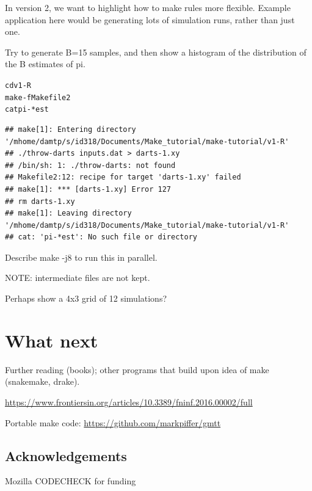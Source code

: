 \documentclass[12pt]{article}\usepackage[]{graphicx}\usepackage[]{color}
\makeatletter
\newenvironment{kframe}{%
 \def\at@end@of@kframe{}%
 \ifinner\ifhmode%
  \def\at@end@of@kframe{\end{minipage}}%
  \begin{minipage}{\columnwidth}%
 \fi\fi%
 \def\FrameCommand##1{\hskip\@totalleftmargin \hskip-\fboxsep
 \colorbox{shadecolor}{##1}\hskip-\fboxsep
     \hskip-\linewidth \hskip-\@totalleftmargin \hskip\columnwidth}%
 \MakeFramed {\advance\hsize-\width
   \@totalleftmargin\z@ \linewidth\hsize
   \@setminipage}}%
 {\par\unskip\endMakeFramed%
 \at@end@of@kframe}
\newenvironment{knitrout}{}{} %
\makeatother
\begin{document}
In version 2, we want to highlight how to make rules more flexible.
Example application here would be generating lots of simulation runs,
rather than just one.


\fbox{}

Try to generate B=15 samples, and then show a histogram of the
distribution of the B estimates of pi.


\begin{knitrout}
\color{fgcolor}\begin{kframe}
\begin{alltt}
cd v1-R
make -f Makefile2
cat pi-*est
\end{alltt}

\begin{verbatim}
## make[1]: Entering directory '/mhome/damtp/s/id318/Documents/Make_tutorial/make-tutorial/v1-R'
## ./throw-darts inputs.dat > darts-1.xy
## /bin/sh: 1: ./throw-darts: not found
## Makefile2:12: recipe for target 'darts-1.xy' failed
## make[1]: *** [darts-1.xy] Error 127
## rm darts-1.xy
## make[1]: Leaving directory '/mhome/damtp/s/id318/Documents/Make_tutorial/make-tutorial/v1-R'
## cat: 'pi-*est': No such file or directory
\end{verbatim}
\end{kframe}
\end{knitrout}


Describe make -j8 to run this in parallel.


NOTE: intermediate files are not kept.  

Perhaps show a 4x3 grid of 12 simulations?

\section{What next}

Further reading (books); other programs that build upon idea of make
(snakemake, drake).

\url{https://www.frontiersin.org/articles/10.3389/fninf.2016.00002/full}

Portable make code: \url{https://github.com/markpiffer/gmtt}


\subsection{Acknowledgements}

Mozilla CODECHECK for funding
\end{document}
